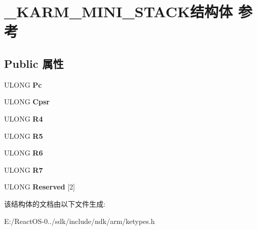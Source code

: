 \hypertarget{struct___k_a_r_m___m_i_n_i___s_t_a_c_k}{}\section{\+\_\+\+K\+A\+R\+M\+\_\+\+M\+I\+N\+I\+\_\+\+S\+T\+A\+C\+K结构体 参考}
\label{struct___k_a_r_m___m_i_n_i___s_t_a_c_k}
\subsection*{Public 属性}
\begin{DoxyCompactItemize}
\item 
\mbox{\label{struct___k_a_r_m___m_i_n_i___s_t_a_c_k_a338febaea7fec71ff972993e665340a3}} 
U\+L\+O\+NG {\bfseries Pc}
\item 
\mbox{\label{struct___k_a_r_m___m_i_n_i___s_t_a_c_k_af6c58938117d18243d4bf71f6f71a551}} 
U\+L\+O\+NG {\bfseries Cpsr}
\item 
\mbox{\label{struct___k_a_r_m___m_i_n_i___s_t_a_c_k_a068ff46f5923abd3ccc130af87f6a3bc}} 
U\+L\+O\+NG {\bfseries R4}
\item 
\mbox{\label{struct___k_a_r_m___m_i_n_i___s_t_a_c_k_af0b0a12d1534cc75dc4e48b1c986c3b6}} 
U\+L\+O\+NG {\bfseries R5}
\item 
\mbox{\label{struct___k_a_r_m___m_i_n_i___s_t_a_c_k_abaa85fa1273218b2c95c89c630b81800}} 
U\+L\+O\+NG {\bfseries R6}
\item 
\mbox{\label{struct___k_a_r_m___m_i_n_i___s_t_a_c_k_adb9a35f9850138548b08487bf03e2d32}} 
U\+L\+O\+NG {\bfseries R7}
\item 
\mbox{\label{struct___k_a_r_m___m_i_n_i___s_t_a_c_k_ad53aebc4a0b14772d2b38aa3e82ebe0e}} 
U\+L\+O\+NG {\bfseries Reserved} \mbox{[}2\mbox{]}
\end{DoxyCompactItemize}


该结构体的文档由以下文件生成\+:\begin{DoxyCompactItemize}
\item 
E\+:/\+React\+O\+S-\/0../sdk/include/ndk/arm/ketypes.\+h\end{DoxyCompactItemize}
